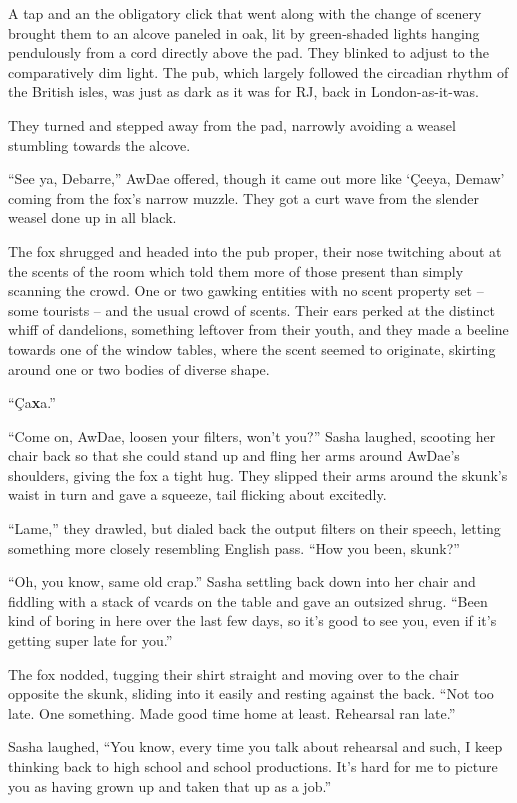 A tap and an the obligatory click that went along with the change of scenery brought them to an alcove paneled in oak, lit by green-shaded lights hanging pendulously from a cord directly above the pad.  They blinked to adjust to the comparatively dim light.  The pub, which largely followed the circadian rhythm of the British isles, was just as dark as it was for RJ, back in London-as-it-was.

They turned and stepped away from the pad, narrowly avoiding a weasel stumbling towards the alcove.

``See ya, Debarre,'' AwDae offered, though it came out more like `\c{C}eeya, Demaw' coming from the fox's narrow muzzle.  They got a curt wave from the slender weasel done up in all black.

The fox shrugged and headed into the pub proper, their nose twitching about at the scents of the room which told them more of those present than simply scanning the crowd.  One or two gawking entities with no scent property set -- some tourists -- and the usual crowd of scents.  Their ears perked at the distinct whiff of dandelions, something leftover from their youth, and they made a beeline towards one of the window tables, where the scent seemed to originate, skirting around one or two bodies of diverse shape.

``\c{C}a\textbf{x}a.''

``Come on, AwDae, loosen your filters, won't you?'' Sasha laughed, scooting her chair back so that she could stand up and fling her arms around AwDae's shoulders, giving the fox a tight hug.  They slipped their arms around the skunk's waist in turn and gave a squeeze, tail flicking about excitedly.

``Lame,'' they drawled, but dialed back the output filters on their speech, letting something more closely resembling English pass.  ``How you been, skunk?''

``Oh, you know, same old crap.''  Sasha settling back down into her chair and fiddling with a stack of vcards on the table and gave an outsized shrug.  ``Been kind of boring in here over the last few days, so it's good to see you, even if it's getting super late for you.''

The fox nodded, tugging their shirt straight and moving over to the chair opposite the skunk, sliding into it easily and resting against the back.  ``Not too late.  One something.  Made good time home at least.  Rehearsal ran late.''


Sasha laughed, ``You know, every time you talk about rehearsal and such, I keep thinking back to high school and school productions.  It's hard for me to picture you as having grown up and taken that up as a job.''

